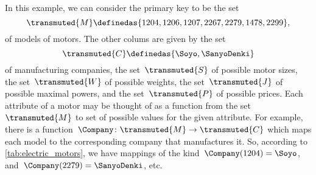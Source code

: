 \begin{comment}
  \begin{table}[h]
    \centering
    \begin{tabular}{c|c|c|c|c|c}
      Motor ID          & Company              & Size      & \unit[Weight]{[g]} & \unit[Max Power]{[W]} & \unit[price]{[USD]} \\
      \hline
      $\textsf{Model1}$ & Company $\textsf{B}$ & 2 x 3 x 4 & 10                 &                       & 259                 \\
      $\textsf{Model2}$ & Company $\textsf{A}$ & 2 x 3 x 4 & 20                 &                       & 109                 \\
      $\textsf{Model3}$ & Company $\textsf{B}$ & 2 x 3 x 4 & 5                  &                       & 124                 \\
      $\textsf{Model4}$ & Company $\textsf{C}$ & 2 x 3 x 4 & 30                 &                       & 399                 \\
      $\textsf{Model5}$ & Company $\textsf{A}$ & 2 x 3 x 4 & 45                 &                       & 245                 \\
      $\textsf{Model6}$ & Company $\textsf{D}$ & 2 x 3 x 4 & 20                 &                       & 89                  \\
      $\textsf{Model7}$ & Company $\textsf{B}$ & 2 x 3 x 4 & 15                 &                       & 130
    \end{tabular}
    \caption{A simplified catalogue of motors.}
    \label{tab:electric_motors}
  \end{table}
\end{comment}

In this example, we can consider the primary key to be the set
\begin{equation*}
  \transmuted{M} \definedas \{ 1204, 1206, 1207, 2267, 2279, 1478, 2299 \},
\end{equation*}
of models of motors. The other colums are given by the set
\begin{equation*}
  \transmuted{C} \definedas \{ \Soyo,\SanyoDenki\}
\end{equation*}
of manufacturing companies, the set~$\transmuted{S}$ of possible motor sizes, the set~$\transmuted{W}$ of possible weights, the set~$\transmuted{J}$ of possible maximal powers, and the set~$\transmuted{P}$ of possible prices. Each attribute of a motor may be thought of as a function from the set~$\transmuted{M}$ to set of possible values for the given attribute. For example, there is a function~$\Company\colon \transmuted{M} \to \transmuted{C}$ which maps each model to the corresponding company that manufactures it. So, according to \cref{tab:electric_motors}, we have mappings of the kind~$\Company(1204) = \Soyo$, and~$\Company(2279) =\SanyoDenki$, etc.

